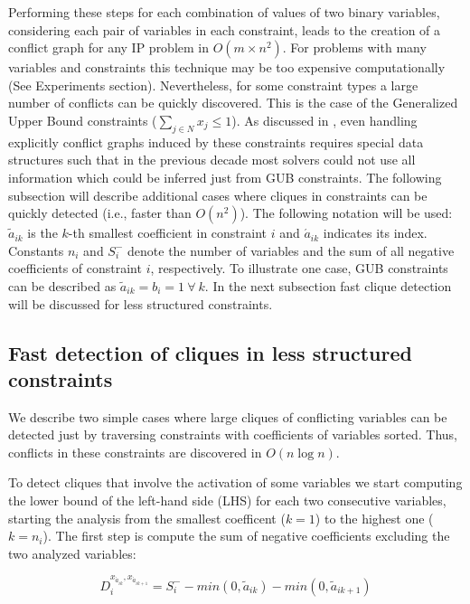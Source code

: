 \documentclass{endm}
\begin{document}
Performing these steps for each combination of values of two binary variables, considering each pair of variables in each constraint, leads to the creation of a conflict graph for any IP problem in $O(m \times n^2)$. For problems with many variables and constraints this technique may be too expensive computationally (See Experiments section). Nevertheless, for some constraint types a large number of conflicts can be quickly discovered. This is the case of the Generalized Upper Bound constraints ($\sum_{j\in N}x_j \leq 1$). As discussed in \cite{atamturk}, even handling explicitly conflict graphs induced by these constraints requires special data structures such that in the previous decade most solvers could not use all information which could be inferred just from GUB constraints. The following subsection will describe additional cases where cliques in constraints can be quickly detected (i.e., faster than $O(n^2)$). The following notation will be used: $\tilde{a}_{ik}$ is the $k$-th smallest coefficient in constraint $i$ and $\acute{a}_{ik}$ indicates its index. Constants $n_i$ and $S_i^-$ denote the number of variables and the sum of all negative coefficients of constraint $i$, respectively. To illustrate one case, GUB constraints can be described as $\tilde{a}_{ik}=b_i=1 \ \forall \ k$. In the next subsection fast clique detection will be discussed for less structured constraints.


\subsection{Fast detection of cliques in less structured constraints}

We describe two simple cases where large cliques of  conflicting variables can be detected just by traversing constraints with  coefficients of variables sorted. Thus, conflicts in these constraints are discovered in $O( n \log n)$.

To detect cliques that involve the activation of some variables we start computing the lower bound of the left-hand side (LHS) for each two consecutive variables, starting the analysis from the smallest coefficent ($k=1$) to the highest one ($k=n_i$). The first step is compute the sum of negative coefficients excluding the two analyzed variables:

\begin{equation}
D_{i}^{x_{\acute{a}_{ik}}, x_{\acute{a}_{ik+1}}} = S_i^- - min(0, \tilde{a}_{ik}) - min(0, \tilde{a}_{ik+1})
\end{equation}
\end{document}
